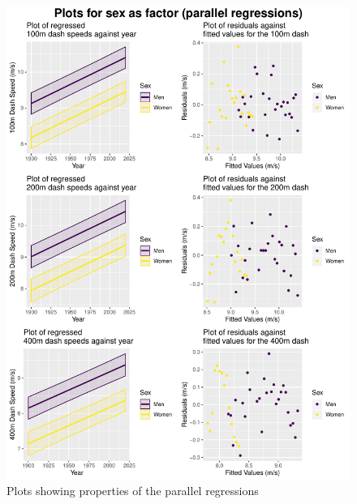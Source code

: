 \documentclass[11pt]{article}
\begin{document}
\begin{figure}
	
	\centering
	\includegraphics[width=\textwidth]{pplots}
	\caption{Plots showing properties of the parallel regressions}
	\label{fig:pplots}
\end{figure}
\end{document}
